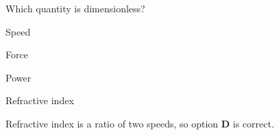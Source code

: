 \documentclass[teacher]{physicsquiz}
\begin{document}
\begin{quizquestionbank}[1]
  \begin{quizquestion}[
    id=optional-outcome,
    topic=measurement,
    difficulty=foundation,
    marks=1.5,
    correct=d,
    tags={units,dimensions}
  ]
    Which quantity is dimensionless?
    \begin{choiceoptions}
      \item Speed
      \item Force
      \item Power
      \item Refractive index
    \end{choiceoptions}
  \end{quizquestion}
  \begin{quizsolution}
    Refractive index is a ratio of two speeds, so option \textbf{D} is correct.
  \end{quizsolution}
\end{quizquestionbank}


\begin{quizanswerkeycontent}
  \printquizanswerkey
\end{quizanswerkeycontent}

\begin{quizteachercontent}
  \printquizteacherreport
\end{quizteachercontent}
\end{document}
